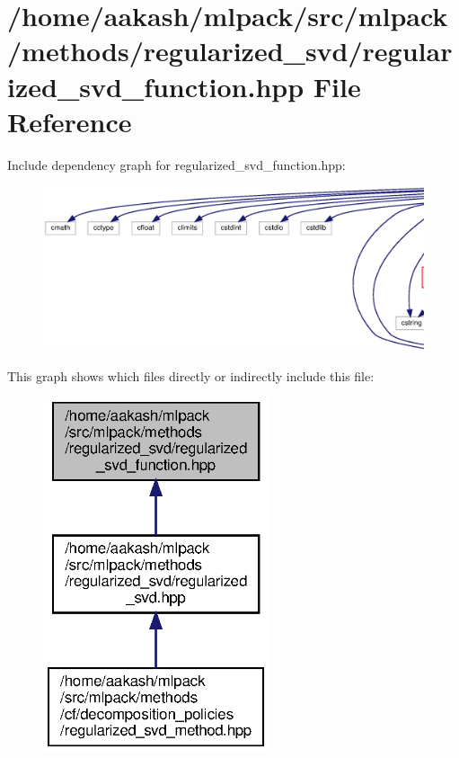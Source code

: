 \section{/home/aakash/mlpack/src/mlpack/methods/regularized\+\_\+svd/regularized\+\_\+svd\+\_\+function.hpp File Reference}
\label{regularized__svd__function_8hpp}
Include dependency graph for regularized\+\_\+svd\+\_\+function.\+hpp\+:
\nopagebreak
\begin{figure}[H]
\begin{center}
\leavevmode
\includegraphics[width=350pt]{regularized__svd__function_8hpp__incl}
\end{center}
\end{figure}
This graph shows which files directly or indirectly include this file\+:
\nopagebreak
\begin{figure}[H]
\begin{center}
\leavevmode
\includegraphics[width=188pt]{regularized__svd__function_8hpp__dep__incl}
\end{center}
\end{figure}
